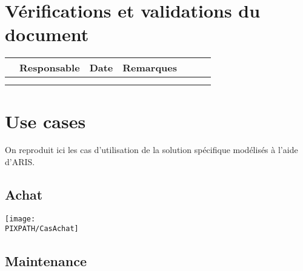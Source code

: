 \documentclass[twoside]{article}
\newcommand\PIXPATH{./docs/pics}
\begin{document}

\section*{Vérifications et validations du document}

\begin{center}
\begin{longtable}{|m{15mm}|m{36mm}|m{36mm}|m{60mm}|}
\hline
 & Responsable & Date & Remarques\endhead \hline
& %
& %
& %
\\\hline

& %

& %

& %

\\\hline

& %

& %

& %

\\\hline
\end{longtable}
\end{center}

\pagebreak


\tableofcontents
\vfill
\pagebreak




\section{Use cases}

On reproduit ici les cas d'utilisation de la solution spécifique modélisés
à l'aide d'ARIS.

\subsection{Achat}

\begin{center}
\texttt{[image: \\PIXPATH/CasAchat]}
\end{center}

\subsection{Maintenance}
\end{document}
